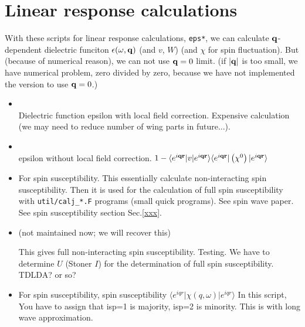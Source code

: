 \newpage
\section{Linear response calculations}
\label{linearr}
With these scripts for linear response calculations, \verb#eps*#,
we can calculate
${\bf q}$-dependent dielectric funciton
$\epsilon(\omega ,{\bf q})$ (and $v$, $W$) (and $\chi$ for spin fluctuation).
But (because of numerical reason), we can not use ${\bf q} = 0$ limit.
(if $|{\bf q}|$ is too small, we have numerical problem, zero divided by
zero, because we have not implemented the version to use ${\bf q}=0$.)
\begin{itemize}
\item {}\\
   Dielectric function epsilon with local field correction.
   Expensive calculation (we may need to reduce number of wing parts in
      future...).

\item {}\\
   epsilon without local field correction.
   $1- \langle e^{i {\bf q} {\bf r}} |v|e^{i {\bf q} {\bf r}}\rangle  \langle e^{i {\bf q} {\bf r}}| \left( \chi^{0} \right) |e^{i {\bf q} {\bf r}}\rangle$


\item {}

    For spin susceptibility. This essentially calculate non-interacting spin susceptibility.
    Then it is used for the calculation of full spin susceptibility with \verb#util/calj_*.F# programs
    (small quick programs). See spin wave paper.
    See spin susceptibility section Sec.\ref{xxx}.

\item (not maintained now; we will recover this)

    This gives full non-interacting spin susceptibility. Testing.
    We have to determine $U$ (Stoner $I$) for the determination of full spin susceptibility.
    TDLDA? or so?


\item {}

  For spin susceptibility, 
  spin susceptibility $\langle e^{iqr}| \chi(q,\omega) |e^{iqr} \rangle$
  In this script, You have to assign that isp=1 is majority, isp=2 is minority.
  This is with long wave approximation.  

\end{itemize}

